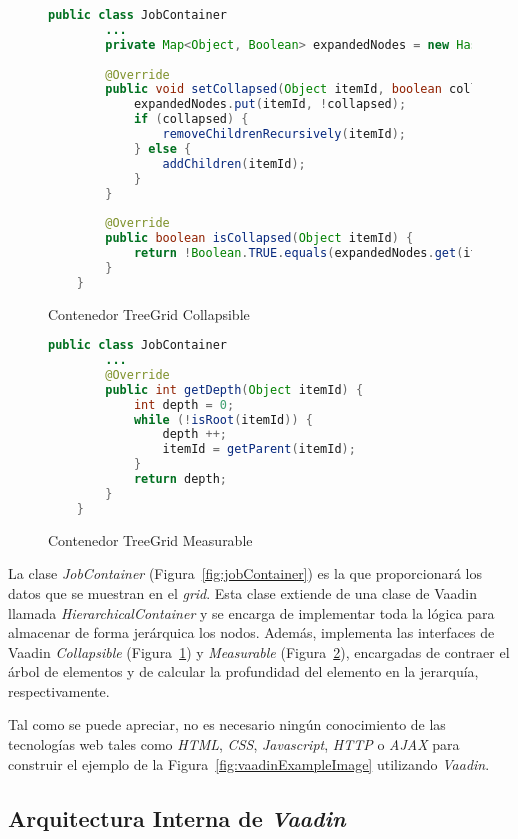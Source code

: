 \begin{figure}[H]
	\centering
	\begin{lstlisting}[language=Java]
	public class JobContainer
		...
		private Map<Object, Boolean> expandedNodes = new HashMap<>();
		
		@Override
		public void setCollapsed(Object itemId, boolean collapsed) {
			expandedNodes.put(itemId, !collapsed);	
			if (collapsed) {
				removeChildrenRecursively(itemId);
			} else {
				addChildren(itemId);
			}
		}
		
		@Override
		public boolean isCollapsed(Object itemId) {
			return !Boolean.TRUE.equals(expandedNodes.get(itemId));
		}
	}\end{lstlisting}
	\caption{Contenedor TreeGrid Collapsible}
	\label{fig:jobContainerCollapsible}
\end{figure}

\begin{figure}[H]
	\centering
	\begin{lstlisting}[language=Java]	
	public class JobContainer	
		...
		@Override
		public int getDepth(Object itemId) {
			int depth = 0;
			while (!isRoot(itemId)) {
				depth ++;
				itemId = getParent(itemId);
			}
			return depth;
		}
	}\end{lstlisting}
	\caption{Contenedor TreeGrid Measurable}
	\label{fig:jobContainerMeasurable}
\end{figure}

La clase \emph{JobContainer} (Figura~\ref{fig:jobContainer}) es la que proporcionará los datos que se muestran en el \emph{grid}. Esta clase extiende de una clase de Vaadin llamada \emph{HierarchicalContainer} y se encarga de implementar toda la lógica para almacenar de forma jerárquica los nodos. Además, implementa las interfaces de Vaadin \emph{Collapsible} (Figura~\ref{fig:jobContainerCollapsible}) y \emph{Measurable} (Figura~\ref{fig:jobContainerMeasurable}), encargadas de contraer el árbol de elementos y de calcular la profundidad del elemento en la jerarquía, respectivamente.

Tal como se puede apreciar, no es necesario ningún conocimiento de las tecnologías web tales como \emph{HTML}, \emph{CSS}, \emph{Javascript}, \emph{HTTP} o \emph{AJAX} para construir el ejemplo de la Figura~\ref{fig:vaadinExampleImage} utilizando \emph{Vaadin}.

\subsection{Arquitectura Interna de \emph{Vaadin}}

